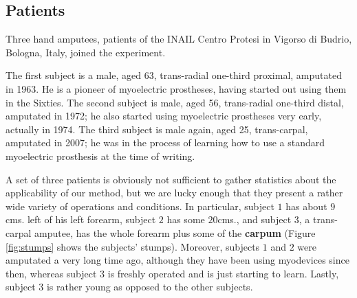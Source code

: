 \subsection{Patients}

Three hand amputees, patients of the INAIL Centro Protesi in Vigorso
di Budrio, Bologna, Italy, joined the experiment.

The first subject is a male, aged 63, trans-radial one-third proximal,
amputated in 1963. He is a pioneer of myoelectric prostheses, having
started out using them in the Sixties. The second subject is male,
aged 56, trans-radial one-third distal, amputated in 1972; he also
started using myoelectric prostheses very early, actually in 1974. The
third subject is male again, aged 25, trans-carpal, amputated in 2007;
he was in the process of learning how to use a standard myoelectric
prosthesis at the time of writing.

A set of three patients is obviously not sufficient to gather
statistics about the applicability of our method, but we are lucky
enough that they present a rather wide variety of operations and
conditions. In particular, subject $1$ has about $9$cms. left of his
left forearm, subject $2$ has some $20$cms., and subject $3$, a
trans-carpal amputee, has the whole forearm plus some of the
\textbf{carpum} (Figure \ref{fig:stumps} shows the subjects'
stumps). Moreover, subjects $1$ and $2$ were amputated a very long time
ago, although they have been using myodevices since then, whereas
subject $3$ is freshly operated and is just starting to learn. Lastly,
subject $3$ is rather young as opposed to the other subjects.

